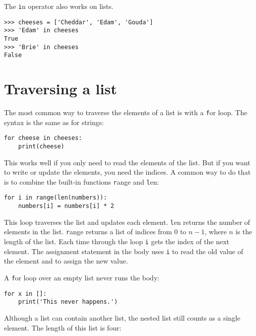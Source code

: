 \documentclass[
DIV=11,
fontsize=13,
twoside,
headinclude=false,
titlepage=firstiscover,
abstract=true,
headsepline=true,
footsepline=true,
chapterprefix=true, %
headings=big,
bibliography=totoc,%
captions=tableheading
]{scrbook}
\theoremstyle{definition}
\begin{document}

The {\texttt in} operator also works on lists.

\begin{lstlisting}
>>> cheeses = ['Cheddar', 'Edam', 'Gouda']
>>> 'Edam' in cheeses
True
>>> 'Brie' in cheeses
False
\end{lstlisting}


\section{Traversing a list}

The most common way to traverse the elements of a list is
with a {\texttt for} loop.  The syntax is the same as for strings:

\begin{lstlisting}
for cheese in cheeses:
    print(cheese)
\end{lstlisting}
%
This works well if you only need to read the elements of the
list.  But if you want to write or update the elements, you
need the indices.  A common way to do that is to combine
the built-in functions {\texttt range} and {\texttt len}:

\begin{lstlisting}
for i in range(len(numbers)):
    numbers[i] = numbers[i] * 2
\end{lstlisting}
%
This loop traverses the list and updates each element.  {\texttt len}
returns the number of elements in the list.  {\texttt range} returns
a list of indices from 0 to $n-1$, where $n$ is the length of
the list.  Each time through the loop {\texttt i} gets the index
of the next element.  The assignment statement in the body uses
{\texttt i} to read the old value of the element and to assign the
new value.

A {\texttt for} loop over an empty list never runs the body:

\begin{lstlisting}
for x in []:
    print('This never happens.')
\end{lstlisting}
%
Although a list can contain another list, the nested
list still counts as a single element.  The length of this list is
four:
\end{document}
